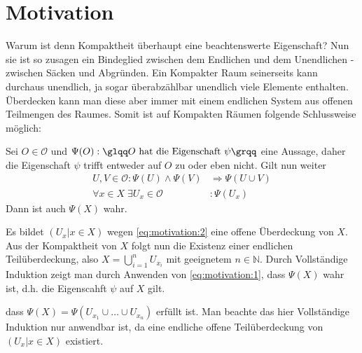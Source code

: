 \section{Motivation}
Warum ist denn Kompaktheit überhaupt eine beachtenswerte Eigenschaft? Nun sie ist so zusagen ein Bindeglied zwischen dem 
Endlichen und dem Unendlichen - zwischen Säcken und Abgründen. Ein Kompakter Raum seinerseits 
kann durchaus unendlich, ja sogar überabzählbar unendlich viele Elemente enthalten. Überdecken kann man diese aber immer mit
einem endlichen System aus offenen Teilmengen des Raumes. Somit ist auf Kompakten Räumen folgende Schlussweise möglich:
\\
\begin{Satz}
Sei \(O \in \mathcal{O}\) und \( \Psi(O) : \mbox{\glqq} O \mbox{ hat die Eigenschaft } \psi \mbox{\grqq} \) eine Aussage, 
daher die Eigenschaft \(\psi\) trifft entweder auf \(O\) zu oder eben nicht.
Gilt nun weiter
\begin{align}
	U, V \in \mathcal{O} : \Psi(U) \land \Psi(V) &\Rightarrow \Psi(U \cup V) \label{eq:motivation:1}\\
	\forall x \in X \; \exists U_x \in \mathcal{O} &: \Psi(U_x) \label{eq:motivation:2}
\end{align}
Dann ist auch \(\Psi(X)\) wahr.
\end{Satz}

Es bildet \( (U_x | x \in X) \) wegen \eqref{eq:motivation:2} eine offene Überdeckung von \(X\). Aus der Kompaktheit von \(X\) folgt nun 
die Existenz einer endlichen Teilüberdeckung, also \(X =  \bigcup_{i=1}^{n} U_{x_i}\) mit geeignetem \( n \in \mathbb{N} \). 
Durch Vollständige Induktion zeigt man durch Anwenden von \eqref{eq:motivation:1}, dass \(\Psi(X)\) wahr ist, d.h. die 
Eigenscahft \(\psi\) auf \(X\) gilt.

dass \( \Psi(X) = \Psi(U_{x_1} \cup \dots \cup U_{x_n})\) erfüllt ist. Man beachte das hier Vollständige Induktion
nur anwendbar ist, da eine endliche offene Teilüberdeckung von \( (U_x | x \in X) \) existiert.

